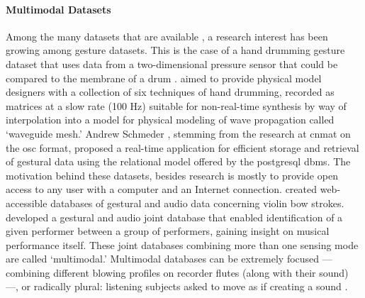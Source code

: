 \paragraph{Multimodal Datasets}
Among the many datasets that are available , a research interest has been growing among gesture datasets. This is the case of a hand drumming gesture dataset that uses data from a two-dimensional pressure sensor that could be compared to the membrane of a drum \parencite{DBLP:conf/icmc/JonesLS07}. \citeauthor{DBLP:conf/icmc/JonesLS07} aimed to provide physical model designers with a collection of six techniques of hand drumming, recorded as matrices at a slow rate (100 Hz) suitable for non-real-time synthesis by way of interpolation into a model for physical modeling of wave propagation called `waveguide mesh.' Andrew Schmeder \parencite{icmc/bbp2372.2009.005}, stemming from the research at \gls{cnmat} on the \gls{osc} format, proposed a real-time application for efficient storage and retrieval of gestural data using the relational model offered by the \gls{postgresql} \gls{dbms}. The motivation behind these datasets, besides research is mostly to provide open access to any user with a computer and an Internet connection. \textcite{Young2007} created web-accessible databases of gestural and audio data concerning violin bow strokes. \textcite{Hochenbaum2010} developed a gestural and audio joint database that enabled identification of a given performer between a group of performers, gaining insight on musical performance itself. These joint databases combining more than one sensing mode are called `multimodal.' Multimodal databases can be extremely focused ---combining different blowing profiles on recorder flutes (along with their sound) \parencite{Garcia2011}---, or radically plural: listening subjects asked to move as if creating a sound \parencite{fvisi:2017}. 

